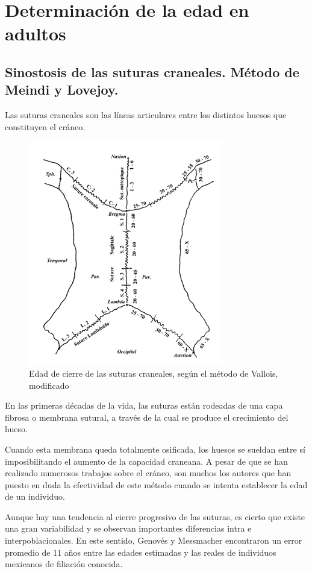 \documentclass[a4paper,11pt]{article}
\begin{document}
\section{Determinación de la edad en adultos}
\subsection{Sinostosis de las suturas craneales. Método de Meindi y Lovejoy.}
Las suturas craneales son las líneas articulares entre los distintos huesos que constituyen el cráneo.
\begin{figure}[h!]
\centering
\includegraphics[scale=1]{9.png}
\caption{Edad de cierre de las suturas craneales, según el método de Vallois, modificado \cite{olivier1960pratique}}
\end{figure}
En las primeras décadas de la vida, las suturas están rodeadas de una capa fibrosa o membrana sutural, a través de la cual se produce el crecimiento del hueso.

Cuando esta membrana queda totalmente osificada, los huesos se sueldan entre sí imposibilitando el aumento de la capacidad craneana. A pesar de que se han realizado numerosos trabajos sobre el cráneo, son muchos los autores que han puesto en duda la efectividad de este método cuando se intenta establecer la edad de un individuo.

Aunque hay una tendencia al cierre progresivo de las suturas, es cierto que existe una gran variabilidad y se observan importantes diferencias intra e interpoblacionales. En este sentido, Genovés y Messmacher encontraron un error promedio de 11 años entre las edades estimadas y las reales de individuos mexicanos de filiación conocida.
\end{document}
